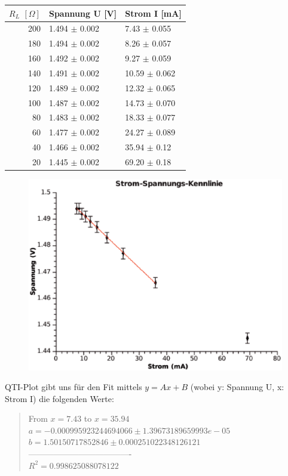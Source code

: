 \documentclass{article}
\begin{document}
\begin{tabular}{|r|l|l|}
\hline
$R_L$ $[\Omega]$ & Spannung U [V] & Strom I [mA]\\
\hline
200 & 1.494 $\pm$ 0.002 & 7.43 $\pm$ 0.055\\
180 & 1.494 $\pm$ 0.002 & 8.26 $\pm$ 0.057\\
160 & 1.492 $\pm$ 0.002 & 9.27 $\pm$ 0.059\\
140 & 1.491 $\pm$ 0.002 & 10.59 $\pm$ 0.062\\
120 & 1.489 $\pm$ 0.002 & 12.32 $\pm$ 0.065\\
100 & 1.487 $\pm$ 0.002 & 14.73 $\pm$ 0.070\\
80 & 1.483 $\pm$ 0.002 & 18.33 $\pm$ 0.077\\
60 & 1.477 $\pm$ 0.002 & 24.27 $\pm$ 0.089\\
40 & 1.466 $\pm$ 0.002 & 35.94 $\pm$ 0.12\\
20 & 1.445 $\pm$ 0.002 & 69.20 $\pm$ 0.18\\
\hline
\end{tabular}


\begin{center}
\begin{figure}[H]
\includegraphics[scale=0.5]{batterie_kennlinie.eps} 
\end{figure}
\end{center}

QTI-Plot gibt uns für den Fit mittels $y=Ax+B$ (wobei y: Spannung U, x: Strom I) die folgenden Werte: 
\begin{quote}
From $x = 7.43$ to $x = 35.94$\\
$a  = -0.000995923244694066 \pm 1.39673189659993e-05$\\
$b  = 1.50150717852846 \pm 0.000251022348126121$\\
-------------------------------------\\
$R^2 = 0.998625088078122$\\
\end{quote}
\end{document}
